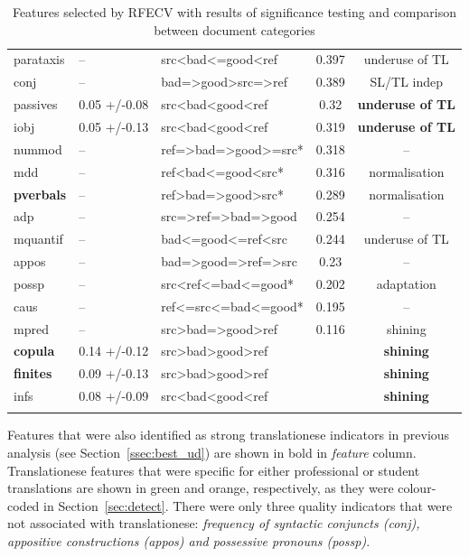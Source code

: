 \begin{longtable}{l|llcc}
		\textcolor{Dandelion}{parataxis}    & --  & src<bad<=good<ref    & 0.397 & underuse of TL \\
		conj         & --           & bad=>good>src=>ref & 0.389 &  SL/TL indep \\
		\textcolor{cadmiumgreen}{passives}     & 0.05 +/-0.08 & src<bad<good<ref & 0.32 & \textbf{underuse of TL} \\
		\textcolor{Dandelion}{iobj}    & 0.05 +/-0.13 & src<bad<good<ref & 0.319 & \textbf{underuse of TL} \\
		\textcolor{Dandelion}{nummod}  & -- & ref=>bad=>good>=src* & 0.318 & -- \\
		\textcolor{cadmiumgreen}{mdd}  & -- & ref<bad<=good<src*    & 0.316 & normalisation \\
		\textbf{pverbals}     & --     & ref>bad=>good>src* & 0.289 & normalisation  \\
		\textcolor{cadmiumgreen}{adp}  & -- & src=>ref=>bad=>good & 0.254 & -- \\
		\textcolor{Dandelion}{mquantif}& -- & bad<=good<=ref<src & 0.244 & underuse of TL  \\
		appos        & --           & bad=>good=>ref=>src & 0.23 & --  \\
		possp        & --           & src<ref<=bad<=good*    & 0.202 & adaptation \\
		\textcolor{Dandelion}{caus} & -- & ref<=src<=bad<=good*  & 0.195 & -- \\
		\textcolor{Dandelion}{mpred} & -- & src>bad=>good>ref & 0.116 & shining \\
		\midrule
		\textbf{copula}       & 0.14 +/-0.12 & src>bad>good>ref &  & \textbf{shining}           \\
		\textbf{finites}      & 0.09 +/-0.13 & src>bad>good>ref &     & \textbf{shining}      \\
		\textcolor{Dandelion}{infs}         & 0.08 +/-0.09 & src<bad<good<ref    &  & \textbf{shining}          \\		
		\bottomrule
\caption{\label{tab:bad-good_indicators}Features selected by RFECV with results of significance testing and comparison between document categories}\\
\end{longtable}
Features that were also identified as strong translationese indicators in previous analysis (see Section~\ref{ssec:best_ud}) are shown in bold in \textit{feature} column. Translationese features that were specific for either professional or student translations are shown in green and orange, respectively, as they were colour-coded in Section~\ref{sec:detect}. There were only three quality indicators that were not associated with translationese: \textit{frequency of syntactic conjuncts (\textit{conj}), appositive constructions (\textit{appos}) and possessive pronouns (\textit{possp})}.
